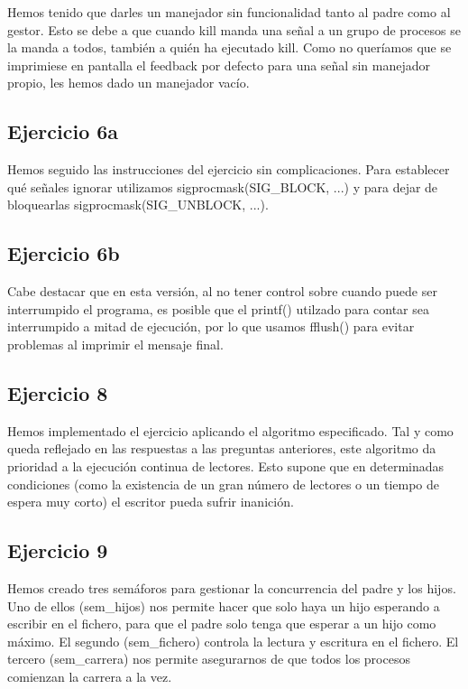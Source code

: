 \documentclass[]{article}
\begin{document}
Hemos tenido que darles un manejador sin funcionalidad tanto al padre como al gestor. Esto se debe a que cuando kill manda una señal a un grupo de procesos se la manda a todos, también a quién ha ejecutado kill. Como no queríamos que se imprimiese en pantalla el feedback por defecto para una señal sin manejador propio, les hemos dado un manejador vacío. 

\subsection*{Ejercicio 6a}
Hemos seguido las instrucciones del ejercicio sin complicaciones. Para establecer qué señales ignorar utilizamos sigprocmask(SIG\_BLOCK, ...) y para dejar de bloquearlas sigprocmask(SIG\_UNBLOCK, ...). \\

\subsection*{Ejercicio 6b}
Cabe destacar que en esta versión, al no tener control sobre cuando puede ser interrumpido el programa, es posible que el printf() utilzado para contar sea interrumpido a mitad de ejecución, por lo que usamos fflush() para evitar problemas al imprimir el mensaje final.

\subsection*{Ejercicio 8}
Hemos implementado el ejercicio aplicando el algoritmo especificado. Tal y como queda reflejado en las respuestas a las preguntas anteriores, este algoritmo da prioridad a la ejecución continua de lectores. Esto supone que en determinadas condiciones (como la existencia de un gran número de lectores o un tiempo de espera muy corto) el escritor pueda sufrir inanición.

\subsection*{Ejercicio 9}
Hemos creado tres semáforos para gestionar la concurrencia del padre y los hijos. Uno de ellos (sem\_hijos) nos permite hacer que solo haya un hijo esperando a escribir en el fichero, para que el padre solo tenga que esperar a un hijo como máximo. El segundo (sem\_fichero) controla la lectura y escritura en el fichero. El tercero (sem\_carrera) nos permite asegurarnos de que todos los procesos comienzan la carrera a la vez.
\end{document}
